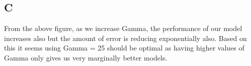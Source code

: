 \documentclass[11pt]{article} %
\begin{document}
\subsection{C}
\begin{figure}[h]
\centering
{}
\qquad
\end{figure}
From the above figure, as we increase Gamma, the performance of our model increases also but the amount of error is reducing exponentially also. Based on this it seems using Gamma = 25 should be optimal as having higher values of Gamma only gives us very marginally better models.\\\\
\begin{figure}[h]
\centering
{}
\qquad
{}
\qquad
\end{figure}
\end{document}
